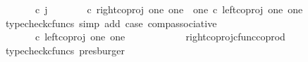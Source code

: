 \begin{isabellebody}
\ {\isachardoublequoteopen}{\isacharparenleft}{\kern0pt}{\isasymlangle}{\isasymf}{\isacharcomma}{\kern0pt}\ {\isasymf}{\isasymrangle}{\isasymamalg}\ {\isacharparenleft}{\kern0pt}{\isasymlangle}{\isasymt}{\isacharcomma}{\kern0pt}\ {\isasymf}{\isasymrangle}\ {\isasymamalg}{\isasymlangle}{\isasymf}{\isacharcomma}{\kern0pt}\ {\isasymt}{\isasymrangle}{\isacharparenright}{\kern0pt}{\isacharparenright}{\kern0pt}\ {\isasymcirc}\isactrlsub c\ j\ {\isacharequal}{\kern0pt}\ {\isacharparenleft}{\kern0pt}{\isacharparenleft}{\kern0pt}{\isasymlangle}{\isasymf}{\isacharcomma}{\kern0pt}\ {\isasymf}{\isasymrangle}{\isasymamalg}\ {\isacharparenleft}{\kern0pt}{\isasymlangle}{\isasymt}{\isacharcomma}{\kern0pt}\ {\isasymf}{\isasymrangle}\ {\isasymamalg}{\isasymlangle}{\isasymf}{\isacharcomma}{\kern0pt}\ {\isasymt}{\isasymrangle}{\isacharparenright}{\kern0pt}{\isacharparenright}{\kern0pt}\ {\isasymcirc}\isactrlsub c\ right{\isacharunderscore}{\kern0pt}coproj\ one\ {\isacharparenleft}{\kern0pt}one\ {\isasymCoprod}\ one{\isacharparenright}{\kern0pt}{\isacharparenright}{\kern0pt}\ {\isasymcirc}\isactrlsub c\ left{\isacharunderscore}{\kern0pt}coproj\ one\ one{\isachardoublequoteclose}\isanewline
\ \ \ \ \ \ \ \ \ \ \isamarkupfalse%
\ {\isacharparenleft}{\kern0pt}typecheck{\isacharunderscore}{\kern0pt}cfuncs{\isacharcomma}{\kern0pt}\ simp\ add{\isacharcolon}{\kern0pt}\ case{}\ comp{\isacharunderscore}{\kern0pt}associative{}{\isacharparenright}{\kern0pt}\isanewline
\ \ \ \ \ \ \ \ \isamarkupfalse%
\ \isamarkupfalse%
\ {\isachardoublequoteopen}{\isachardot}{\kern0pt}{\isachardot}{\kern0pt}{\isachardot}{\kern0pt}\ {\isacharequal}{\kern0pt}\ {\isacharparenleft}{\kern0pt}{\isasymlangle}{\isasymt}{\isacharcomma}{\kern0pt}\ {\isasymf}{\isasymrangle}\ {\isasymamalg}{\isasymlangle}{\isasymf}{\isacharcomma}{\kern0pt}\ {\isasymt}{\isasymrangle}{\isacharparenright}{\kern0pt}\ {\isasymcirc}\isactrlsub c\ left{\isacharunderscore}{\kern0pt}coproj\ one\ one{\isachardoublequoteclose}\isanewline
\ \ \ \ \ \ \ \ \ \ \isamarkupfalse%
\ right{\isacharunderscore}{\kern0pt}coproj{\isacharunderscore}{\kern0pt}cfunc{\isacharunderscore}{\kern0pt}coprod\ \isamarkupfalse%
\ {\isacharparenleft}{\kern0pt}typecheck{\isacharunderscore}{\kern0pt}cfuncs{\isacharcomma}{\kern0pt}\ presburger{\isacharparenright}{\kern0pt}\isanewline
\ \ \ \ \ \ \ \ \isamarkupfalse%
\ \isamarkupfalse%
\ {\isachardoublequoteopen}{\isachardot}{\kern0pt}{\isachardot}{\kern0pt}{\isachardot}{\kern0pt}\ {\isacharequal}{\kern0pt}\ {\isasymlangle}{\isasymt}{\isacharcomma}{\kern0pt}\ {\isasymf}{\isasymrangle}{\isachardoublequoteclose}\isanewline

\end{isabellebody}

